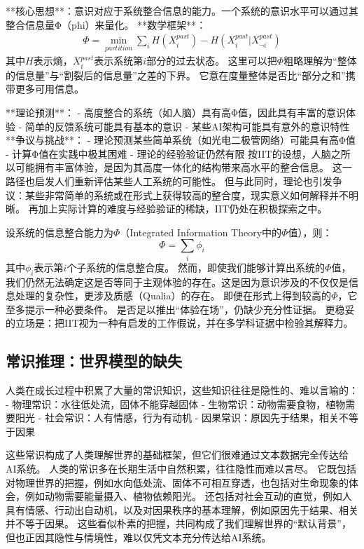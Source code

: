 **核心思想**：意识对应于系统整合信息的能力。一个系统的意识水平可以通过其整合信息量Φ（phi）来量化。
**数学框架**：
\begin{align}
\Phi = \min_{partition} \sum_{i} H(X_i^{past}) - H(X_i^{past}|X_{\neg i}^{past})
\end{align}
其中$H$表示熵，$X_i^{past}$表示系统第$i$部分的过去状态。
这里可以把$\Phi$粗略理解为“整体的信息量”与“割裂后的信息量”之差的下界。
它意在度量整体是否比“部分之和”携带更多可用信息。

**理论预测**：
- 高度整合的系统（如人脑）具有高Φ值，因此具有丰富的意识体验
- 简单的反馈系统可能具有基本的意识
- 某些AI架构可能具有意外的意识特性
**争议与挑战**：
- 理论预测某些简单系统（如光电二极管网络）可能具有高Φ值
- 计算Φ值在实践中极其困难
- 理论的经验验证仍然有限
按IIT的设想，人脑之所以可能拥有丰富体验，是因为其高度一体化的结构带来高水平的整合信息。
这一路径也启发人们重新评估某些人工系统的可能性。
但与此同时，理论也引发争议：某些非常简单的系统或在形式上获得较高的整合度，现实意义如何解释并不明晰。
再加上实际计算的难度与经验验证的稀缺，IIT仍处在积极探索之中。

设系统的信息整合能力为$\Phi$（Integrated Information Theory中的$\Phi$值），则：
\begin{equation}
\Phi = \sum_{i} \phi_i
\end{equation}
其中$\phi_i$表示第$i$个子系统的信息整合度。
然而，即使我们能够计算出系统的$\Phi$值，我们仍然无法确定这是否等同于主观体验的存在。这是因为意识涉及的不仅仅是信息处理的复杂性，更涉及质感（Qualia）的存在。
即便在形式上得到较高的$\Phi$，它至多提示一种必要条件。
是否足以推出“体验在场”，仍缺少充分性证据。
更稳妥的立场是：把IIT视为一种有启发的工作假说，并在多学科证据中检验其解释力。

\subsection{常识推理：世界模型的缺失}

人类在成长过程中积累了大量的常识知识，这些知识往往是隐性的、难以言喻的：
- 物理常识：水往低处流，固体不能穿越固体
- 生物常识：动物需要食物，植物需要阳光
- 社会常识：人有情感，行为有动机
- 因果常识：原因先于结果，相关不等于因果

这些常识构成了人类理解世界的基础框架，但它们很难通过文本数据完全传达给AI系统。
人类的常识多在长期生活中自然积累，往往隐性而难以言尽。
它既包括对物理世界的把握，例如水向低处流、固体不可相互穿透，也包括对生命现象的体会，例如动物需要能量摄入、植物依赖阳光。
还包括对社会互动的直觉，例如人具有情感、行动出自动机，以及对因果秩序的基本理解，例如原因先于结果、相关并不等于因果。
这些看似朴素的把握，共同构成了我们理解世界的“默认背景”，但也正因其隐性与情境性，难以仅凭文本充分传达给AI系统。

